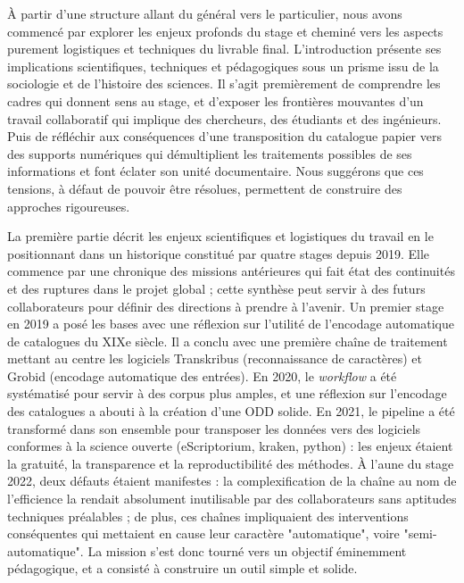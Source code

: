 \documentclass[a4paper,12pt,twoside]{book}
\begin{document}
À partir d'une structure allant du général vers le particulier, nous avons commencé par explorer les enjeux profonds du stage et cheminé vers les aspects purement logistiques et techniques du livrable final. L'introduction présente ses implications scientifiques, techniques et pédagogiques sous un prisme issu de la sociologie et de l'histoire des sciences. Il s'agit premièrement de comprendre les cadres qui donnent sens au stage, et d'exposer les frontières mouvantes d'un travail collaboratif qui implique des chercheurs, des étudiants et des ingénieurs. Puis de réfléchir aux conséquences d'une transposition du catalogue papier vers des supports numériques qui démultiplient les traitements possibles de ses informations et font éclater son unité documentaire. Nous suggérons que ces tensions, à défaut de pouvoir être résolues, permettent de construire des approches rigoureuses.

La première partie décrit les enjeux scientifiques et logistiques du travail en le positionnant dans un historique constitué par quatre stages depuis 2019. Elle commence par une chronique des missions antérieures qui fait état des continuités et des ruptures dans le projet global ; cette synthèse peut servir à des futurs collaborateurs pour définir des directions à prendre à l'avenir. Un premier stage en 2019 a posé les bases avec une réflexion sur l'utilité de l'encodage automatique de catalogues du XIXe siècle. Il a conclu avec une première chaîne de traitement mettant au centre les logiciels Transkribus (reconnaissance de caractères) et Grobid (encodage automatique des entrées). En 2020, le \textit{workflow} a été systématisé pour servir à des corpus plus amples, et une réflexion sur l'encodage des catalogues a abouti à la création d'une ODD solide. En 2021, le pipeline a été transformé dans son ensemble pour transposer les données vers des logiciels conformes à la science ouverte (eScriptorium, kraken, python) : les enjeux étaient la gratuité, la transparence et la reproductibilité des méthodes. À l'aune du stage 2022, deux défauts étaient manifestes : la complexification de la chaîne au nom de l'efficience la rendait absolument inutilisable par des collaborateurs sans aptitudes techniques préalables ; de plus, ces chaînes impliquaient des interventions conséquentes qui mettaient en cause leur caractère "automatique", voire "semi-automatique". La mission s'est donc tourné vers un objectif éminemment pédagogique, et a consisté à construire un outil simple et solide. 
\end{document}
